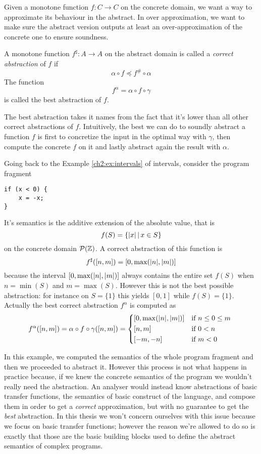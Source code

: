 Given a monotone function $f : C \rightarrow C$ on the concrete domain, we want a way to approximate its behaviour in the abstract. In over approximation, we want to make sure the abstract version outputs at least an over-approximation of the concrete one to ensure soundness.
\begin{definition}
	A monotone function $f^{\sharp} : A \rightarrow A$ on the abstract domain is called a \textit{correct abstraction} of $f$ if
	\[
	\alpha \circ f \preceq f^{\#} \circ \alpha
	\]
	The function
	\[
	f^{\alpha} = \alpha \circ f \circ \gamma
	\]
	is called the best abstraction of $f$.
\end{definition}
The best abstraction takes it names from the fact that it's lower than all other correct abstractions of $f$. Intuitively, the best we can do to soundly abstract a function $f$ is first to concretize the input in the optimal way with $\gamma$, then compute the concrete $f$ on it and lastly abstract again the result with $\alpha$.
\begin{example}
	Going back to the Example \ref{ch2:ex:intervals} of intervals, consider the program fragment
\begin{verbatim}
if (x < 0) {
	x = -x;
}
\end{verbatim}
	It's semantics is the additive extension of the absolute value, that is
	\[
	f(S) = \{ \lvert x\rvert \,\vert\, x \in S \}
	\]
	on the concrete domain $\mathcal{P}(\mathbb{Z})$. A correct abstraction of this function is
	\[
	f^{\sharp}([n, m]) = [0, \max(\lvert n\rvert, \lvert m\rvert)]
	\]
	because the interval $[0, \max(\lvert n\rvert, \lvert m\rvert)]$ always contains the entire set $f(S)$ when $n = \min(S)$ and $m = \max(S)$. However this is not the best possible abstraction: for instance on $S = \{ 1 \}$ this yields $[0, 1]$ while $f(S) = \{ 1 \}$. Actually the best correct abstraction $f^{\alpha}$ is computed as
	\[
	f^{\alpha}([n, m]) = \alpha \circ f \circ \gamma([n, m]) = \begin{cases*}
		[0, \max(\abs{n}, \abs{m})] &if $n \le 0 \le m$ \\
		[n, m] &if $0 < n$ \\
		[-m, -n] &if $m < 0$ \\
	\end{cases*}
	\]
\end{example}
In this example, we computed the semantics of the whole program fragment and then we proceeded to abstract it. However this process is not what happens in practice because, if we knew the concrete semantics of the program we wouldn't really need the abstraction. An analyser would instead know abstractions of basic transfer functions, the semantics of basic construct of the language, and compose them in order to get a \textit{correct} approximation, but with no guarantee to get the \textit{best} abstraction. In this thesis we won't concern ourselves with this issue because we focus on basic transfer functions; however the reason we're allowed to do so is exactly that those are the basic building blocks used to define the abstract semantics of complex programs.

